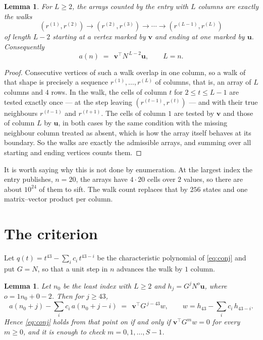 \documentclass[11pt,a4paper]{article}
\theoremstyle{plain}
\newtheorem{lemma}[theorem]{Lemma}
\theoremstyle{definition}
\begin{document}
\begin{lemma}\label{lem:walk}
For $L\ge2$, the arrays counted by the entry with $L$ columns are exactly the walks
\[
(r^{(1)},r^{(2)})\to(r^{(2)},r^{(3)})\to\cdots\to(r^{(L-1)},r^{(L)})
\]
of length $L-2$ starting at a vertex marked by $\mathbf{v}$ and ending at one marked by
$\mathbf{u}$. Consequently
\[
a(n)\;=\;\,\mathbf{v}^{\!\top}N^{\,L-2}\mathbf{u},\qquad L=n .
\]
\end{lemma}

\begin{proof}
Consecutive vertices of such a walk overlap in one column, so a walk of that shape is
precisely a sequence $r^{(1)},\dots,r^{(L)}$ of columns, that is, an array of $L$ columns
and $4$ rows. In the walk, the cells of column $t$ for $2\le t\le L-1$ are tested
exactly once --- at the step leaving $(r^{(t-1)},r^{(t)})$ --- and with their true
neighbours $r^{(t-1)}$ and $r^{(t+1)}$. The cells of column $1$ are tested by
$\mathbf{v}$ and those of column $L$ by $\mathbf{u}$, in both cases by the same condition
with the missing neighbour column treated as absent, which is how the array itself behaves at
its boundary. So the walks are exactly the admissible arrays, and summing over all starting
and ending vertices counts them.
\end{proof}


It is worth saying why this is not done by enumeration. At the largest index the entry
publishes, $n=20$, the arrays have $4\cdot20$ cells over
$2$ values, so there are about $10^{24}$ of them to sift. The
walk count replaces that by $256$ states and one matrix--vector product per column.
\section{The criterion}

Let $q(t)=t^{43}-\sum_i c_i\,t^{43-i}$ be the characteristic polynomial of
\eqref{eq:conj} and put $G=N$, so that a unit step in $n$ advances the walk by
$1$ column.

\begin{lemma}\label{lem:crit}
Let $n_0$ be the least index with $L\ge2$ and $h_j=G^{j}N^{o}\mathbf{u}$, where
$o=1n_0+0-2$. Then for $j\ge43$,
\[
a(n_0+j)-\sum_i c_i\,a(n_0+j-i)\;=\;\,\mathbf{v}^{\!\top}G^{\,j-43}w,
\qquad w=h_{43}-\sum_i c_i\,h_{43-i} .
\]
Hence \eqref{eq:conj} holds from that point on if and only if
$\mathbf{v}^{\!\top}G^{m}w=0$ for every $m\ge0$, and it is enough to check
$m=0,1,\dots,S-1$.
\end{lemma}
\end{document}
